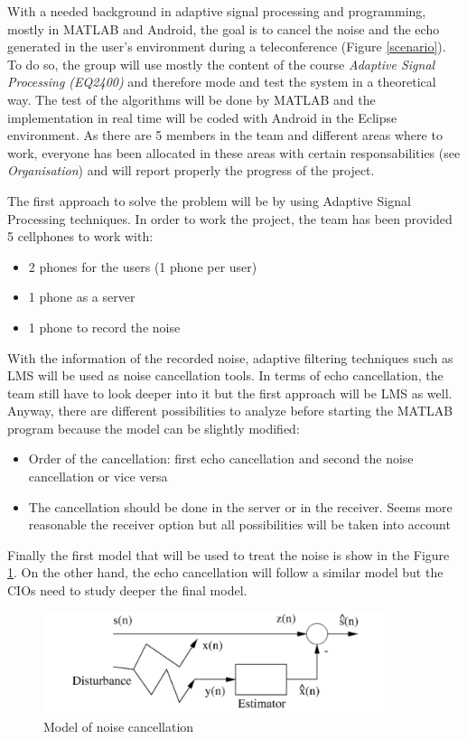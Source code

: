 \documentclass[11pt]{article}
\begin{document}
With a needed background in adaptive signal processing and programming, mostly in MATLAB and Android, the goal is to cancel the noise and the echo generated in the user's environment during a teleconference (Figure \ref{scenario}). To do so, the group will use mostly the content of the course \textit{Adaptive Signal Processing (EQ2400)} and therefore mode and test the system in a theoretical way. The test of the algorithms will be done by MATLAB and the implementation in real time will be coded with Android in the Eclipse environment. As there are 5 members in the team and different areas where to work, everyone has been allocated in these areas with certain responsabilities (see \textit{Organisation}) and will report properly the progress of the project.
		
The first approach to solve the problem will be by using Adaptive Signal Processing techniques. In order to work the project, the team has been provided 5 cellphones to work with:

\begin{itemize}
\item 2 phones for the users (1 phone per user)
\item 1 phone as a server
\item 1 phone to record the noise
\end{itemize}

With the information of the recorded noise, adaptive filtering techniques such as LMS will be used as noise cancellation tools. In terms of echo cancellation, the team still have to look deeper into it but the first approach will be LMS as well. Anyway, there are different possibilities to analyze before starting the MATLAB program because the model can be slightly modified:

\begin{itemize}
\item Order of the cancellation: first echo cancellation and second the noise cancellation or vice versa
\item The cancellation should be done in the server or in the receiver. Seems more reasonable the receiver option but all possibilities will be taken into account
\end{itemize}


Finally the first model that will be used to treat the noise is show in the Figure \ref{model}. On the other hand, the echo cancellation will follow a similar model but the CIOs need to study deeper the final model.

		\begin{figure}[h]
		\centering
		\includegraphics[width=10cm]{model}
		\caption{Model of noise cancellation}
		\label{model}
		\end{figure}
\end{document}
